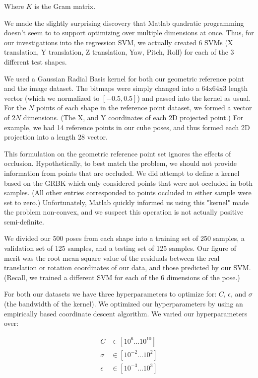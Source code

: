 \documentclass[journal]{IEEEtran}
\begin{document}
\noindent Where $K$ is the Gram matrix.

We made the slightly surprising discovery that Matlab quadratic programming doesn't seem to to support optimizing over multiple dimensions at once. Thus, for our investigations into the regression SVM, we actually created 6 SVMs (X translation, Y translation, Z translation, Yaw, Pitch, Roll) for each of the 3 different test shapes.

We used a Gaussian Radial Basis kernel for both our geometric reference point and the image dataset. The bitmaps were simply changed into a 64x64x3 length vector (which we normalized to $[-0.5, 0.5]$) and passed into the kernel as usual. For the $N$ points of each shape in the reference point dataset, we formed a vector of $2N$ dimensions. (The X, and Y coordinates of each 2D projected point.)  For example, we had 14 reference points in our cube poses, and thus formed each 2D projection into a length 28 vector.

This formulation on the geometric reference point set ignores the effects of occlusion. Hypothetically, to best match the problem, we should not provide information from points that are occluded. We did attempt to define a kernel based on the GRBK which only considered points that were not occluded in both samples. (All other entries corresponded to points occluded in either sample were set to zero.)
Unfortunately, Matlab quickly informed us using this "kernel" made the problem non-convex, and we suspect this operation is not actually positive semi-definite.

We divided our 500 poses from each shape into a training set of 250 samples, a validation set of 125 samples, and a testing set of 125 samples. Our figure of merit was the root mean square value of the residuals between the real translation or rotation coordinates of our data, and those predicted by our SVM. (Recall, we trained a different SVM for each of the 6 dimensions of the pose.)

For both our datasets we have three hyperparameters to optimize for: $C$, $\epsilon$, and $\sigma$ (the bandwidth of the kernel). We optimized our hyperparameters by using an empirically based coordinate descent algorithm. We varied our hyperparameters over:

\begin{align*}
C &\in [10^{6} ... 10^{10}]\\
\sigma &\in [10^{-2} ... 10^{2}]\\
\epsilon &\in [10^{-3} ... 10^{3}]
\end{align*}
\end{document}
